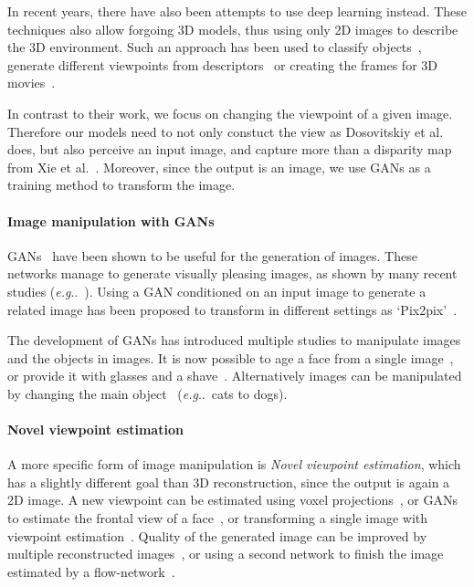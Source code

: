 \documentclass[runningheads]{llncs}
\makeatletter
\DeclareRobustCommand\onedot{\futurelet\@let@token\@onedot}
\def\@onedot{\ifx\@let@token.\else.\null\fi\xspace}
\def\eg{\emph{e.g}\onedot} \def\Eg{\emph{E.g}\onedot}
\newcommand{\myparagraph}[1]{\vspace{-2mm}\paragraph{\textbf{#1}}}
\makeatother
\begin{document}
In recent years, there have also been attempts to use deep learning instead.
These techniques also allow forgoing 3D models, thus using only 2D images to describe the 3D environment.
Such an approach has been used to classify objects~\cite{su2015multi}, generate different viewpoints from descriptors~\cite{dosovitskiy2015learning} or creating the frames for 3D movies~\cite{xie2016deep3d}.

In contrast to their work, we focus on changing the viewpoint of a given image.
Therefore our models need to not only constuct the view as Dosovitskiy et al.~\cite{dosovitskiy2015learning} does, but also perceive an input image, and capture more than a disparity map from Xie et al.~\cite{xie2016deep3d}.
Moreover, since the output is an image, we use GANs as a training method to transform the image.

\myparagraph{Image manipulation with GANs}
GANs~\cite{goodfellow2014generative,mirza2014conditional} have been shown to be useful for the generation of images.
These networks manage to generate visually pleasing images, as shown by many recent studies (\eg~\cite{reed2016generative,denton2015deep,radford2015unsupervised}).
Using a GAN conditioned on an input image to generate a related image has been proposed to transform in different settings as `Pix2pix'~\cite{pix2pix2016}.

The development of GANs has introduced multiple studies to manipulate images and the objects in images.
It is now possible to age a face from a single image~\cite{antipov2017face}, or provide it with glasses and a shave~\cite{shen2017learning}.
Alternatively images can be manipulated by changing the main object~\cite{liang2017generative} (\eg~cats to dogs).

\myparagraph{Novel viewpoint estimation}
A more specific form of image manipulation is \emph{Novel viewpoint estimation}, which has a slightly different goal than 3D reconstruction, since the output is again a 2D image.
A new viewpoint can be estimated using voxel projections~\cite{yan16nips}, or GANs to estimate the frontal view of a face~\cite{huang2017beyond}, or transforming a single image with viewpoint estimation~\cite{zhou16eccv}.
Quality of the generated image can be improved by multiple reconstructed images~\cite{zhou16eccv}, or using a second network to finish the image estimated by a flow-network~\cite{park17cvpr}. 
\end{document}
